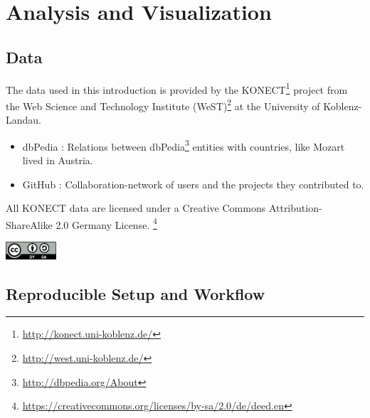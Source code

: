 \documentclass[
a4paper,     %
12pt         %
]{scrartcl}  %
\begin{document}

\section{Analysis and Visualization}
\label{sec:analysis-visualization-ipython}

\subsection{Data}
\label{sub:data}

The data used in this introduction is provided by the KONECT\footnote{\url{http://konect.uni-koblenz.de/}} project from the Web Science and Technology Institute (WeST)\footnote{\url{http://west.uni-koblenz.de/}} at the University of Koblenz-Landau.

\begin{itemize}
\item dbPedia \citep{konect:2014:dbpedia-country}: Relations between dbPedia\footnote{\url{http://dbpedia.org/About}} entities with countries, like Mozart lived in Austria.
\item GitHub \citep{konect:2014:github}: Collaboration-network of users and the projects they contributed to.
\end{itemize}

All KONECT data are licensed under a Creative Commons Attribution-ShareAlike 2.0 Germany License. \footnote{\url{https://creativecommons.org/licenses/by-sa/2.0/de/deed.en}}

\begin{flushleft}
  \includegraphics[width=0.14\textwidth]{./images/cc-by-sa.png}
\end{flushleft}

\subsection{Reproducible Setup and Workflow}
\label{sub:reproducibility-workflow}
\end{document}
